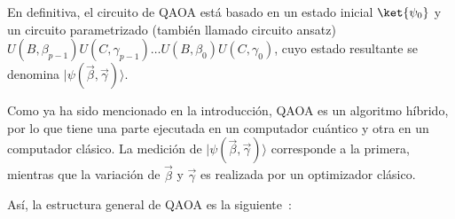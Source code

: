 En definitiva, el circuito de QAOA está basado en un estado inicial $\ket{\psi_0}$ y un circuito parametrizado (también llamado circuito ansatz)
$U(B, \beta_{p-1})U(C, \gamma_{p-1}) \ldots U(B, \beta_0)U(C, \gamma_0)$, cuyo estado resultante se denomina $\lvert \psi(\vec{\beta}, \vec{\gamma}) \rangle$.

Como ya ha sido mencionado en la introducción, QAOA es un algoritmo híbrido, por lo que tiene una parte ejecutada en un computador cuántico y otra en un computador clásico. La medición de $\lvert \psi(\vec{\beta}, \vec{\gamma}) \rangle$ corresponde a la primera, mientras que la variación de $\vec{\beta}$ y $\vec{\gamma}$ es realizada por un optimizador clásico.

Así, la estructura general de QAOA es la siguiente~\cite{qaoa_paper_original}:

